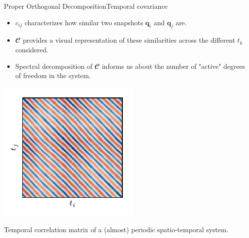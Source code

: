 \documentclass[usenames,dvipsnames,svgnames,10pt,aspectratio=169]{beamer}
\begin{document}
\begin{frame}[t, c]{Proper Orthogonal Decomposition}{Temporal covariance}
	\begin{minipage}{.48\textwidth}
		\begin{itemize}
			\item $c_{ij}$ characterizes how similar two snapshots $\mathbf{q}_i$ and $\mathbf{q}_j$ are.

			\bigskip

			\item $\mathbfcal{C}$ provides a visual representation of these similarities across the different $t_k$ considered.

			\bigskip

			\item Spectral decomposition of $\mathbfcal{C}$ informs us about the number of "active" degrees of freedom in the system.
		\end{itemize}
	\end{minipage}%
	\hfill
	\begin{minipage}{.48\textwidth}
		\centering
		\includegraphics[width=.66\textwidth]{shear_driven_cavity_covariance_matrix_zoom}

		{\small Temporal correlation matrix of a (almost) periodic spatio-temporal system.}
	\end{minipage}

	\vspace{1cm}
\end{frame}
\end{document}
